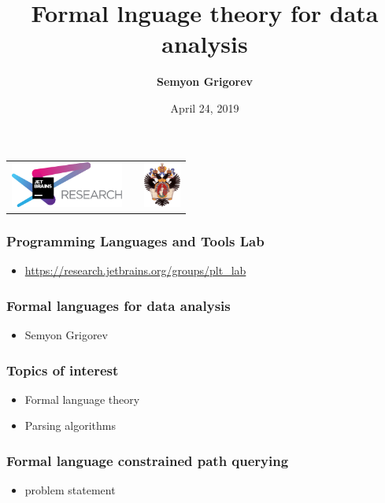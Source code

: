 \documentclass[xcolor=table]{beamer}
\title[Formal lnguage theory for data analysis]{Formal lnguage theory for data analysis}
\institute[JetBrains Research]{
JetBrains Research, Programming Languages and Tools Lab  \\
Saint Petersburg University
}
\author[Semyon Grigorev]{\textbf{Semyon Grigorev}}
\date{April 24, 2019}
\begin{document}
{
\begin{frame}[fragile]
  \begin{table}
  \centering
  \begin{tabularx}{\linewidth}{YcX}
    \includegraphics[height=1.5cm]{pictures/jetbrainsResearch.pdf} \hfill
    & \begin{minipage}[t]{0.3\textwidth}\center \vspace{-1cm}  
      \end{minipage}
    & \hfill \includegraphics[height=1.5cm]{pictures/SPbGU_Logo.png}
  \end{tabularx}
  \end{table}
  \titlepage
\end{frame}
}

\begin{frame} \frametitle{Programming Languages and Tools Lab}
    \begin{itemize}
      \item \url{https://research.jetbrains.org/groups/plt_lab}
    \end{itemize}
\end{frame}


\begin{frame} \frametitle{Formal languages for data analysis}

\begin{itemize}
  \item Semyon Grigorev
\end{itemize}

\end{frame}


\begin{frame} \frametitle{Topics of interest}
\begin{itemize}
\item Formal language theory
\item Parsing algorithms
\end{itemize}
\end{frame}


\begin{frame} \frametitle{Formal language constrained path querying}
\begin{itemize}
\item problem statement
\end{itemize}
\end{frame}
\end{document}
